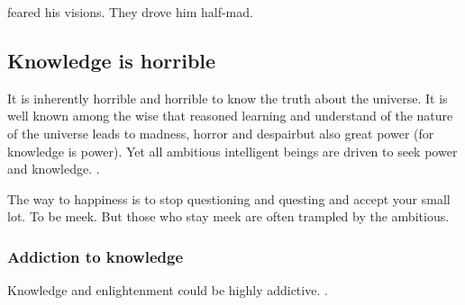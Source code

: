\Sethicus feared his visions. 
They drove him half-mad. 










\subsection{Knowledge is horrible}
It is inherently horrible and horrible to know the truth about the universe. 
It is well known among the wise that reasoned learning and understand of the nature of the universe leads to madness, horror and despair\dash but also great power (for knowledge is power). 
Yet all ambitious intelligent beings are driven to seek power and knowledge. 
. 

The way to happiness is to stop questioning and questing and accept your small lot. 
To be meek. 
But those who stay meek are often trampled by the ambitious. 





\subsubsection{Addiction to knowledge}
Knowledge and enlightenment could be highly addictive. 
. 

